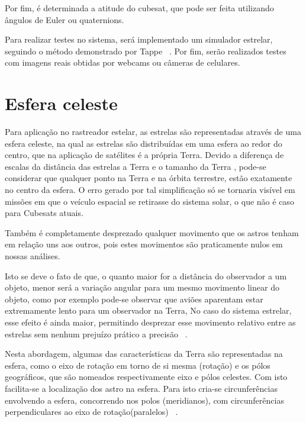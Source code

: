 Por fim, é determinada a atitude do cubesat, que pode ser feita utilizando ângulos de Euler ou quaternions.

Para realizar testes no sistema,  será implementado um simulador estrelar, seguindo o método demonstrado por Tappe ~\cite[]{Tappe}. Por fim, serão realizados testes com imagens reais obtidas por webcams  ou câmeras de celulares.

\section{Esfera celeste}

Para aplicação no rastreador estelar, as estrelas são representadas através de uma esfera celeste, na  qual as estrelas são distribuídas em uma esfera ao redor do centro, que na aplicação de satélites é a própria Terra. Devido a diferença de escalas da distância das estrelas a Terra e o tamanho da Terra , pode-se considerar que qualquer ponto na Terra e na órbita terrestre, estão exatamente no centro da esfera. O erro gerado por tal simplificação só  se tornaria visível em missões em que o veículo espacial se retirasse do sistema solar, o que não é caso para Cubesats atuais.

Também é completamente desprezado qualquer movimento que os astros tenham em relação uns aos outros, pois estes movimentos são praticamente nulos em nossas análises.

Isto se deve o fato de que, o quanto maior for a distância do observador a um objeto, menor será a variação angular para um mesmo movimento linear do objeto, como por exemplo pode-se observar que aviões aparentam estar extremamente lento para um observador na Terra, No caso do sistema estrelar, esse efeito é ainda maior, permitindo desprezar esse movimento relativo entre as estrelas sem nenhum prejuízo prático a precisão ~\cite[]{Carvalho}.

Nesta abordagem, algumas das características da Terra são representadas na esfera, como o eixo de rotação em torno de si mesma (rotação) e os pólos geográficos, que são nomeados respectivamente eixo e pólos celestes. Com isto facilita-se a localização dos astro na esfera. Para isto cria-se circunferências envolvendo a esfera, concorrendo nos polos (meridianos), com circunferências perpendiculares ao eixo de rotação(paralelos) ~\cite[]{Carvalho}.

